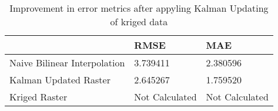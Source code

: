 \begin{table}
\caption{Improvement in error metrics after appyling Kalman Updating of kriged data}
\label{tab:Oahu3_lidar_error}
\begin{tabular}{lll}
\toprule
 & RMSE & MAE \\
\midrule
Naive Bilinear Interpolation & 3.739411 & 2.380596 \\
Kalman Updated Raster & 2.645267 & 1.759520 \\
Kriged Raster & Not Calculated & Not Calculated \\
\bottomrule
\end{tabular}
\end{table}
